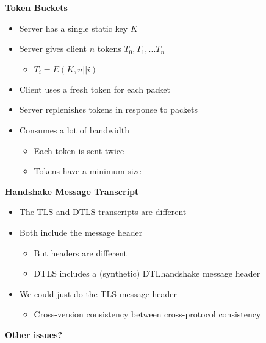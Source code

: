 \documentclass[helvetica]{seminar}
\newcommand{\heading}[1]{%
  \begin{center} 
    \large\bf 
    #1 
  \end{center} 
  \vspace{.4 in}}
\begin{document}
\begin{slide}
\heading{Token Buckets}

\begin{itemize}
\item Server has a single static key $K$
\item Server gives client $n$ tokens $T_0, T_1, ... T_n$
  \begin{itemize}
  \item $T_i = E(K, u || i)$
  \end{itemize}
\item Client uses a fresh token for each packet
\item Server replenishes tokens in response to packets
\item Consumes a lot of bandwidth
  \begin{itemize}
  \item Each token is sent twice
  \item Tokens have a minimum size
  \end{itemize}

\end{itemize}

\end{slide}

\begin{slide}
\heading{Handshake Message Transcript}

\begin{itemize}
\item The TLS and DTLS transcripts are different
\item Both include the message header
  \begin{itemize}
  \item But headers are different
  \item DTLS includes a (synthetic) DTLhandshake message header
  \end{itemize}
\item We could just do the TLS message header
  \begin{itemize}
  \item Cross-version consistency between cross-protocol consistency
  \end{itemize}
\end{itemize}


\end{slide}


\begin{slide}
\heading{Other issues?}

\end{slide}
\end{document}

